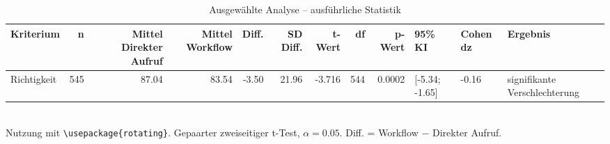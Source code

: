 \begin{table}
\centering
\caption{Ausgewählte Analyse -- ausführliche Statistik}
\begin{tabular}{lrrrrrrrrlll}
\toprule
Kriterium & n & Mittel Direkter Aufruf & Mittel Workflow & Diff. & SD Diff. & t-Wert & df & p-Wert & 95\% KI & Cohen dz & Ergebnis \\
\midrule
Richtigkeit & 545 & 87.04 & 83.54 & -3.50 & 21.96 & -3.716 & 544 & 0.0002 & [-5.34; -1.65] & -0.16 & signifikante Verschlechterung \\
\bottomrule
\end{tabular}
\\[2mm]
\footnotesize Nutzung mit \texttt{\textbackslash usepackage\{rotating\}}. Gepaarter zweiseitiger t-Test, $\alpha=0.05$. Diff. = Workflow $-$ Direkter Aufruf.
\end{table}

